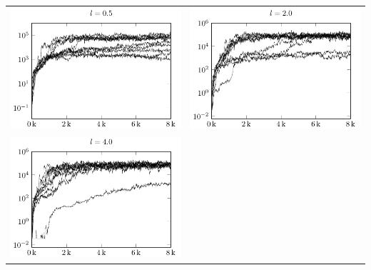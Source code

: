 \begin{tabular}{@{}l@{}l@{}}
\includegraphics[scale=1]{plots/cma_lower_bound_0_5} &
\includegraphics[scale=1]{plots/cma_lower_bound_2_0}\\
\includegraphics[scale=1]{plots/cma_lower_bound_4_0} &
\end{tabular}

